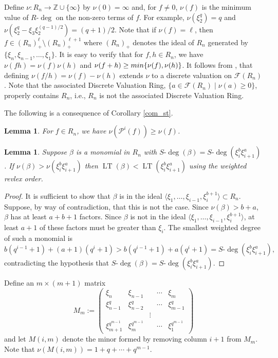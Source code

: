\documentclass{amsart}
\newcommand{\PP}{\mathcal{P}}
\newcommand{\F}{\mathcal{F}}
\newcommand{\Z}{\mathbb{Z}}
\newtheorem{lem}[subsection]{Lemma}
\DeclareMathOperator{\lt}{LT}
\newcommand{\wdeg}{{S\mbox{-}\deg}}
\newcommand{\rdeg}{{R\mbox{-}\deg}}
\begin{document}
Define $\nu:R_{n}\to \Z\cup\{\infty\}$ by $\nu(0)=\infty$ and, for $f\not=0$, $\nu(f)$ is the minimum value of $\rdeg$ on the non-zero terms of $f$.
For example, $\nu(\xi_2^q)=q$ and $\nu(\xi_2^q-\xi_3\xi_2^{(q-1)/2})=(q+1)/2$.
Note that if $\nu(f)=\ell$, then $f\in(R_{n})_+^{\ell}\setminus (R_{n})_+^{\ell+1}$
where $(R_{n})_+$ denotes the ideal of 
$R_{n}$ generated by $\{\xi_{n},\xi_{n-1},\dots,\xi_1\}$.  
It is easy to verify that for $f,h\in R_{n}$, we have $\nu(fh)=\nu(f)\nu(h)$ and
$\nu(f+h)\geq{\rm min}\{\nu(f),\nu(h)\}$.
It follows from \cite[Ch IV, \S 9, Theorem 14]{zariski+samuel-commalge:75}, that 
defining $\nu(f/h)=\nu(f)-\nu(h)$ extends 
$\nu$ to a discrete valuation on $\F(R_{n})$.
Note that the associated Discrete Valuation Ring, $\{a\in\F(R_{n})\mid \nu(a)\geq 0\}$, properly contains $R_{n}$, i.e.,
$R_{n}$ is not the associated Discrete Valuation Ring.


The following is a consequence of Corollary \ref{com_st}.

\begin{lem} \label{nu_st_lem} For $f\in R_{n}$, we have $\nu(\PP^i(f))\geq \nu(f)$.
\end{lem}




\begin{lem} \label{nu_ord_lem}
Suppose $\beta$ is a monomial in $R_{n}$ with $\wdeg(\beta)=\wdeg(\xi_{i}^b\xi_{i+1}^a)$.
If $\nu(\beta)>\nu(\xi_{i}^b\xi_{i+1}^a)$ then $\lt(\beta)<\lt(\xi_{i}^b\xi_{i+1}^a)$ using the weighted revlex order.
\end{lem}
\begin{proof} It is sufficient to show that $\beta$ is in the ideal  
$\langle \xi_1,\ldots,\xi_{i-1},\xi_{i}^{b+1}\rangle \subset R_{n}$.
Suppose, by way of contradiction, that this is not the case. Since $\nu(\beta)>b+a$, $\beta$ has at least $a+b+1$ factors.  Since $\beta$ is not in the ideal 
$\langle \xi_1,\ldots,\xi_{i-1},\xi_{i}^{b+1}\rangle$, 
at least $a+1$ of these factors must be greater than $\xi_{i}$.
The smallest weighted degree of such a monomial is
$$b(q^{i-1}+1)+(a+1)(q^{i}+1)>b(q^{i-1}+1)+a(q^{i}+1)=\wdeg(\xi_{i}^b\xi_{i+1}^a), $$
contradicting the hypothesis that $\wdeg(\beta)=\wdeg(\xi_{i}^b\xi_{i+1}^a)$.
\end{proof}

Define an $m\times (m+1)$ matrix
$$M_m:=\begin{pmatrix}
\xi_{n} & \xi_{n-1} && \cdots & \xi_{m}\\
\xi_{n-1}^q & \xi_{n-2}^q && \cdots & \xi_{m-1}^q\\
&&\vdots&& \\
\xi_{m+1}^{q^{m-1}} & \xi_{m} ^{q^{m-1}} && \cdots & \xi_1^{q^{m-1}} 
\end{pmatrix}
$$ and let $M(i,m)$ denote the minor formed by removing column $i+1$ from $M_m$.
Note that $\nu(M(i,m))=1+q+\cdots +q^{m-1}$.
\end{document}
